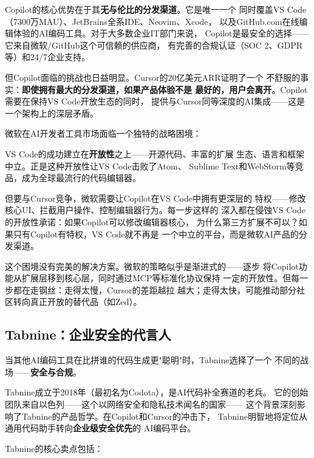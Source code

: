 Copilot的核心优势在于其\textbf{无与伦比的分发渠道}。它是唯一一个
同时覆盖VS Code（7300万MAU）、JetBrains全系IDE、Neovim、Xcode，
以及GitHub.com在线编辑体验的AI编码工具。对于大多数企业IT部门来说，
Copilot是最安全的选择——它来自微软/GitHub这个可信赖的供应商，
有完善的合规认证（SOC 2、GDPR等）和24/7企业支持。

但Copilot面临的挑战也日益明显。Cursor的20亿美元ARR证明了一个
不舒服的事实：\textbf{即使拥有最大的分发渠道，如果产品体验不是
最好的，用户会离开}。Copilot需要在保持VS Code开放生态的同时，
提供与Cursor同等深度的AI集成——这是一个架构上的深层矛盾。

\begin{whybox}
微软在AI开发者工具市场面临一个独特的战略困境：

VS Code的成功建立在\textbf{开放性}之上——开源代码、丰富的扩展
生态、语言和框架中立。正是这种开放性让VS Code击败了Atom、
Sublime Text和WebStorm等竞品，成为全球最流行的代码编辑器。

但要与Cursor竞争，微软需要让Copilot在VS Code中拥有更深层的
特权——修改核心UI、拦截用户操作、控制编辑器行为。每一步这样的
深入都在侵蚀VS Code的开放性承诺：如果Copilot可以修改编辑器核心，
为什么第三方扩展不可以？如果只有Copilot有特权，VS Code就不再是
一个中立的平台，而是微软AI产品的分发渠道。

这个困境没有完美的解决方案。微软的策略似乎是渐进式的——逐步
将Copilot功能从扩展层移到核心层，同时通过MCP等标准化协议保持
一定的开放性。但每一步都在走钢丝：走得太慢，Cursor的差距越拉
越大；走得太快，可能推动部分社区转向真正开放的替代品（如Zed）。
\end{whybox}

\subsection{Tabnine：企业安全的代言人}
\label{subsec:tabnine}

当其他AI编码工具在比拼谁的代码生成更"聪明"时，Tabnine选择了一个
不同的战场——\textbf{安全与合规}。

Tabnine成立于2018年（最初名为Codota），是AI代码补全赛道的老兵。
它的创始团队来自以色列——这个以网络安全和隐私技术闻名的国家——
这个背景深刻影响了Tabnine的产品哲学。在Copilot和Cursor的冲击下，
Tabnine明智地将定位从通用代码助手转向\textbf{企业级安全优先}的
AI编码平台。

Tabnine的核心卖点包括：

